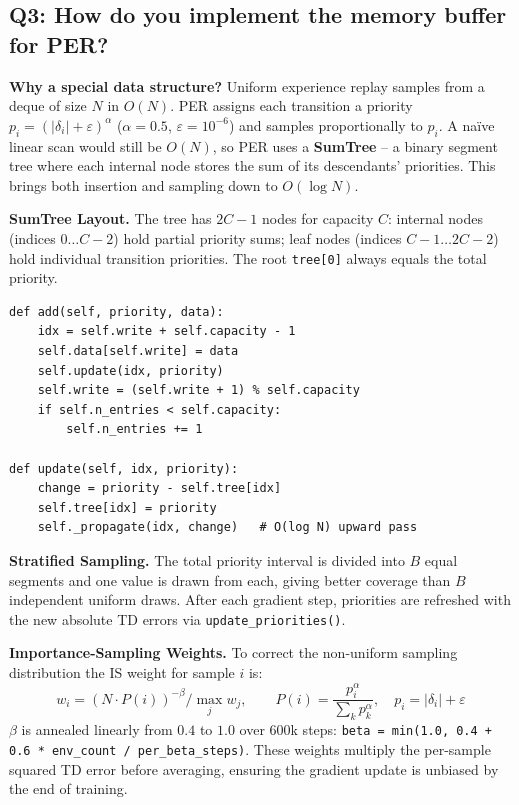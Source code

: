 \documentclass[12pt, a4paper]{report}
\begin{document}
\subsection*{Q3: How do you implement the memory buffer for PER?}

\textbf{Why a special data structure?}
Uniform experience replay samples from a deque of size $N$ in $O(N)$. PER \cite{schaul2016}
assigns each transition a priority $p_i = (|\delta_i| + \varepsilon)^\alpha$ ($\alpha = 0.5$,
$\varepsilon = 10^{-6}$) and samples proportionally to $p_i$.
A naïve linear scan would still be $O(N)$, so PER uses a
\textbf{SumTree} -- a binary segment tree where each internal node stores the sum of its
descendants' priorities. This brings both insertion and sampling down to $O(\log N)$.

\textbf{SumTree Layout.}
The tree has $2C - 1$ nodes for capacity $C$: internal nodes (indices $0 \ldots C-2$) hold
partial priority sums; leaf nodes (indices $C-1 \ldots 2C-2$) hold individual transition priorities.
The root \texttt{tree[0]} always equals the total priority.

\begin{lstlisting}[caption={SumTree: add and update.}]
def add(self, priority, data):
    idx = self.write + self.capacity - 1
    self.data[self.write] = data
    self.update(idx, priority)
    self.write = (self.write + 1) % self.capacity
    if self.n_entries < self.capacity:
        self.n_entries += 1

def update(self, idx, priority):
    change = priority - self.tree[idx]
    self.tree[idx] = priority
    self._propagate(idx, change)   # O(log N) upward pass
\end{lstlisting}

\textbf{Stratified Sampling.}
The total priority interval is divided into $B$ equal segments and one value is drawn from each,
giving better coverage than $B$ independent uniform draws. After each gradient step, priorities
are refreshed with the new absolute TD errors via \texttt{update\_priorities()}.

\textbf{Importance-Sampling Weights.}
To correct the non-uniform sampling distribution the IS weight for sample $i$ is:
\[
  w_i = \left(N \cdot P(i)\right)^{-\beta} \Bigg/ \max_j w_j, \qquad
  P(i) = \frac{p_i^{\alpha}}{\sum_k p_k^{\alpha}}, \quad p_i = |\delta_i| + \varepsilon
\]
$\beta$ is annealed linearly from $0.4$ to $1.0$ over 600k steps:
\texttt{beta = min(1.0, 0.4 + 0.6 * env\_count / per\_beta\_steps)}.
These weights multiply the per-sample squared TD error before averaging, ensuring the gradient
update is unbiased by the end of training.
\end{document}

